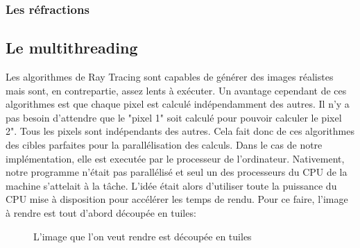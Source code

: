 \documentclass[11pt]{article}
\begin{document}
\subsubsection{Les réfractions}

\subsection{Le multithreading}

Les algorithmes de Ray Tracing sont capables de générer des images réalistes mais sont, en contrepartie, assez lents à exécuter. Un avantage cependant de ces algorithmes est que chaque pixel est calculé indépendamment des autres. Il n'y a pas besoin d'attendre que le "pixel 1" soit calculé pour pouvoir calculer le pixel 2". Tous les pixels sont indépendants des autres. Cela fait donc de ces algorithmes des cibles parfaites pour la parallélisation des calculs. Dans le cas de notre implémentation, elle est executée par le processeur de l'ordinateur. Nativement, notre programme n'était pas parallélisé et seul un des processeurs du CPU de la machine s'attelait à la tâche. L'idée était alors d'utiliser toute la puissance du CPU mise à disposition pour accélérer les temps de rendu. Pour ce faire, l'image à rendre est tout d'abord découpée en tuiles:

\begin{figure}[h!]

	\caption{L'image que l'on veut rendre est découpée en tuiles}
	\label{grilleMultithreading}
\end{figure}
\FloatBarrier
\end{document}
